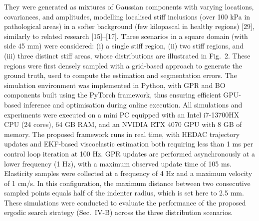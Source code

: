 \documentclass[11pt]{article}
\begin{document}
\vspace{0.8em}

They were generated as mixtures of Gaussian components with varying
locations, covariances, and amplitudes, modelling localised stiff
inclusions (over 100 kPa in pathological areas) in a softer
background (few kilopascal in healthy regions) [29], similarly to
related research [15]--[17]. Three scenarios in a square domain
(with side 45 mm) were considered: (i) a single stiff region,
(ii) two stiff regions, and (iii) three distinct stiff areas, whose
distributions are illustrated in Fig.~2. These regions were first
densely sampled with a grid-based approach to generate the ground
truth, used to compute the estimation and segmentation errors. The
simulation environment was implemented in Python, with GPR and BO
components built using the PyTorch framework, thus ensuring
efficient GPU-based inference and optimisation during online
execution. All simulations and experiments were executed on a mini
PC equipped with an Intel i7-13700HX CPU (24 cores), 64 GB RAM, and
an NVIDIA RTX 4070 GPU with 8 GB of memory. The proposed framework
runs in real time, with HEDAC trajectory updates and EKF-based
viscoelastic estimation both requiring less than 1 ms per control
loop iteration at 100 Hz. GPR updates are performed asynchronously
at a lower frequency (1 Hz), with a maximum observed update time of
105 ms. Elasticity samples were collected at a frequency of 4 Hz and
a maximum velocity of 1 cm/s. In this configuration, the maximum
distance between two consecutive sampled points equals half of the
indenter radius, which is set here to 2.5 mm. These simulations were
conducted to evaluate the performance of the proposed ergodic search
strategy (Sec.~IV-B) across the three distribution scenarios.
\end{document}
